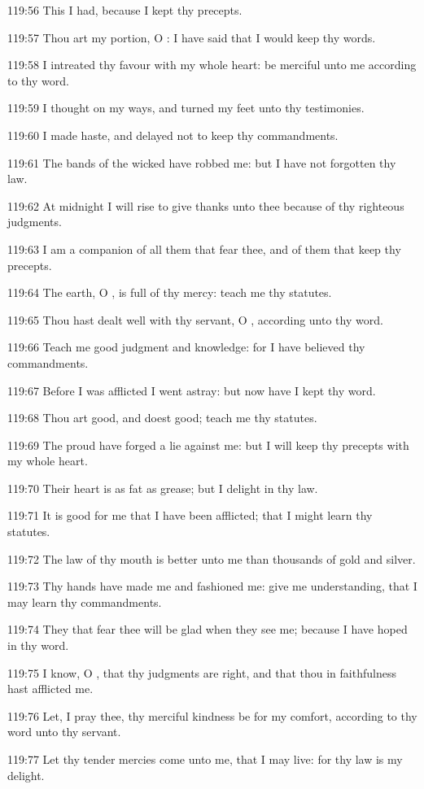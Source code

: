 119:56 This I had, because I kept thy precepts.

119:57 Thou art my portion, O \LORD: I have said that I would keep thy words.

119:58 I intreated thy favour with my whole heart: be merciful unto me according to thy word.

119:59 I thought on my ways, and turned my feet unto thy testimonies.

119:60 I made haste, and delayed not to keep thy commandments.

119:61 The bands of the wicked have robbed me: but I have not forgotten thy law.

119:62 At midnight I will rise to give thanks unto thee because of thy righteous judgments.

119:63 I am a companion of all them that fear thee, and of them that keep thy precepts.

119:64 The earth, O \LORD, is full of thy mercy: teach me thy statutes.

119:65 Thou hast dealt well with thy servant, O \LORD, according unto thy word.

119:66 Teach me good judgment and knowledge: for I have believed thy commandments.

119:67 Before I was afflicted I went astray: but now have I kept thy word.

119:68 Thou art good, and doest good; teach me thy statutes.

119:69 The proud have forged a lie against me: but I will keep thy precepts with my whole heart.

119:70 Their heart is as fat as grease; but I delight in thy law.

119:71 It is good for me that I have been afflicted; that I might learn thy statutes.

119:72 The law of thy mouth is better unto me than thousands of gold and silver.

119:73 Thy hands have made me and fashioned me: give me understanding, that I may learn thy commandments.

119:74 They that fear thee will be glad when they see me; because I have hoped in thy word.

119:75 I know, O \LORD, that thy judgments are right, and that thou in faithfulness hast afflicted me.

119:76 Let, I pray thee, thy merciful kindness be for my comfort, according to thy word unto thy servant.

119:77 Let thy tender mercies come unto me, that I may live: for thy law is my delight.

